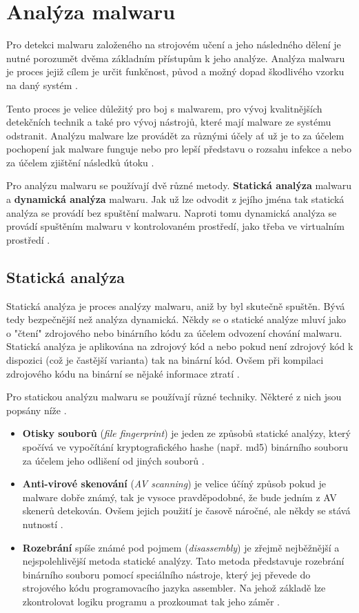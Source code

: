 \section{Analýza malwaru} \label{analysis}
Pro detekci malwaru založeného na strojovém učení a jeho následného dělení je nutné porozumět dvěma základním přístupům k jeho analýze. Analýza malwaru je proces jejiž cílem je určit funkčnost, původ a možný dopad škodlivého vzorku na daný systém \cite{analysis_wiki}.

Tento proces je velice důležitý pro boj s malwarem, pro vývoj kvalitnějších detekčních technik a také pro vývoj nástrojů, které mají malware ze systému odstranit. Analýzu malware lze provádět za různými účely ať už je to za účelem pochopení jak malware funguje
nebo pro lepší představu o rozsahu infekce a nebo za účelem zjištění následků útoku \cite{article_analysis_goat}.

Pro analýzu malwaru se používají dvě různé metody. \textbf{Statická analýza} malwaru a \textbf{dynamická analýza} malwaru. 
Jak už lze odvodit z jejího jména tak statická analýza se provádí bez spuštění malwaru. Naproti tomu dynamická analýza se provádí spuštěním malwaru v kontrolovaném prostředí, 
jako třeba ve virtualním prostředí \cite{article_analysis}.

\subsection*{Statická analýza}
Statická analýza je proces analýzy malwaru, aniž by byl skutečně spuštěn. Bývá tedy bezpečnější než analýza dynamická. Někdy se o statické analýze mluví jako o "čtení" zdrojového nebo binárního kódu za účelem
odvození chování malwaru. Statická analýza je aplikována na zdrojový kód a nebo pokud není zdrojový kód k dispozici (což je častější varianta) tak na binární kód. Ovšem při kompilaci zdrojového kódu na binární se nějaké informace ztratí \cite{article_analysis_goat,static_analysis}.

Pro statickou analýzu malwaru se používají různé techniky. Některé z nich jsou popsány níže \cite{malware_d_s}.
\begin{itemize}
    \item \textbf{Otisky souborů} (\textit{file fingerprint}) je jeden ze způsobů statické analýzy, který spočívá ve vypočítání kryptografického hashe (např. md5) binárního souboru za účelem jeho odlišení od jiných souborů \cite{static_analysis}.
    \item \textbf{Anti-virové skenování} (\textit{AV scanning}) je velice účíný způsob pokud je malware dobře známý, tak je vysoce pravděpodobné, že bude jedním z AV skenerů detekován. Ovšem jejich použití je časově náročné, ale někdy se stává nutností \cite{article_analysis_goat}.
    \item \textbf{Rozebrání} spíše známé pod pojmem (\textit{disassembly}) je zřejmě nejběžnější a nejspolehlivější metoda statické analýzy. Tato metoda představuje rozebrání binárního souboru pomocí speciálního nástroje, který jej převede do strojového kódu programovacího jazyka assembler. Na jehož základě lze zkontrolovat logiku programu a prozkoumat tak jeho záměr \cite{article_analysis_goat}. 
\end{itemize}

